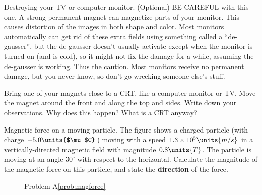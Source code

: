 \newpage

\begin{aproblem}{Destroying your TV or computer monitor.}
  (Optional) BE CAREFUL with this one. A strong permanent magnet can
  magnetize parts of your monitor. This causes distortion of the
  images in both shape and color. Most monitors automatically can get
  rid of these extra fields using something called a ``de-gausser'',
  but the de-gausser doesn't usually activate except when the monitor
  is turned on (and is cold), so it might not fix the damage for a
  while, assuming the de-gausser is working.  Thus the caution. Most
  monitors receive no permanent damage, but you never know, so don't
  go wrecking someone else's stuff.

  Bring one of your magnets close to a CRT, like a computer monitor or
  TV. Move the magnet around the front and along the top and
  sides. Write down your observations.  Why does this happen?  What is
  a CRT anyway?
\end{aproblem}


\begin{aproblem}{Magnetic force on a moving particle.}  
  The figure shows a charged particle (with charge
  $-5.0\units{$\mu$C}$) moving with a speed $1.3 \times
  10^5\units{m/s}$ in a vertically-directed magnetic field with
  magnitude $0.8\units{T}$.  The particle is moving at an angle
  $30^{\circ}$ with respect to the horizontal.  Calculate the
  magnitude of the magnetic force on this particle, and state the {\bf
    direction} of the force. \label{prob:magforce}

  \begin{figure}[h]
    \begin{center}
    \end{center}
    \caption{Problem A\ref{prob:magforce}}
  \end{figure}
\end{aproblem}

